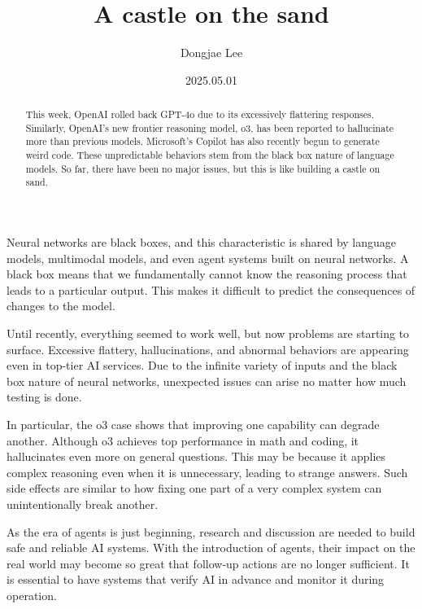 \documentclass[11pt, oneside]{article}
\title{A castle on the sand}
\author{Dongjae Lee}
\date{2025.05.01}
\begin{document}
\maketitle

\begin{abstract}
	This week, OpenAI rolled back GPT-4o due to its excessively flattering responses.
	Similarly, OpenAI's new frontier reasoning model, o3, has been reported to hallucinate more than previous models.
	Microsoft's Copilot has also recently begun to generate weird code.
	These unpredictable behaviors stem from the black box nature of language models.
	So far, there have been no major issues, but this is like building a castle on sand.
\end{abstract}
Neural networks are black boxes, and this characteristic is shared by language models, multimodal models, and even agent systems built on neural networks.
A black box means that we fundamentally cannot know the reasoning process that leads to a particular output.
This makes it difficult to predict the consequences of changes to the model.

Until recently, everything seemed to work well, but now problems are starting to surface.
Excessive flattery, hallucinations, and abnormal behaviors are appearing even in top-tier AI services.
Due to the infinite variety of inputs and the black box nature of neural networks, unexpected issues can arise no matter how much testing is done.

In particular, the o3 case shows that improving one capability can degrade another.
Although o3 achieves top performance in math and coding, it hallucinates even more on general questions.
This may be because it applies complex reasoning even when it is unnecessary, leading to strange answers.
Such side effects are similar to how fixing one part of a very complex system can unintentionally break another.

As the era of agents is just beginning, research and discussion are needed to build safe and reliable AI systems.
With the introduction of agents, their impact on the real world may become so great that follow-up actions are no longer sufficient.
It is essential to have systems that verify AI in advance and monitor it during operation.
\end{document}
